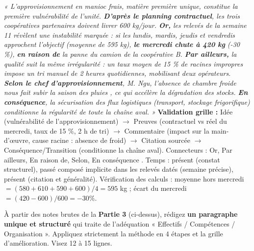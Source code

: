 \documentclass[11pt]{article}
\begin{document}
\begin{exoresolu}
\emph{« L'approvisionnement en manioc frais, matière première unique, constitue la première vulnérabilité de l'unité. \textbf{D'après le planning contractuel}, les trois coopératives partenaires doivent livrer 600 kg/jour. \textbf{Or,} les relevés de la semaine 11 révèlent une instabilité marquée : si les lundis, mardis, jeudis et vendredis approchent l'objectif (moyenne de 595 kg), \textbf{le mercredi chute à 420 kg} (-30 \%), \textbf{en raison de} la panne du camion de la coopérative B. \textbf{Par ailleurs,} la qualité suit la même irrégularité : un taux moyen de 15 \% de racines impropres impose un tri manuel de 2 heures quotidiennes, mobilisant deux opérateurs. \textbf{Selon le chef d'approvisionnement}, M. Ngu, \og l'absence de chambre froide nous fait subir la saison des pluies \fg{}, ce qui accélère la dégradation des stocks. \textbf{En conséquence}, la sécurisation des flux logistiques (transport, stockage frigorifique) conditionne la régularité de toute la chaîne aval. »}
\tcblower
\textcolor{popgreen}{\textbf{Validation grille :}} Idée (vulnérabilité de l'approvisionnement) $\rightarrow$ Preuves (contractuel vs réel du mercredi, taux de 15 \%, 2 h de tri) $\rightarrow$ Commentaire (impact sur la main-d'œuvre, cause racine : absence de froid) $\rightarrow$ Citation sourcée $\rightarrow$ Conséquence/Transition (conditionne la chaîne aval). Connecteurs : \og Or, Par ailleurs, En raison de, Selon, En conséquence \fg{}. Temps : présent (constat structurel), passé composé implicite dans les relevés datés (semaine précise), présent (citation et généralité). Vérification des calculs : moyenne hors mercredi $= (580 + 610 + 590 + 600)/4 = 595$ kg ; écart du mercredi $= (420 - 600)/600 = -30 \%$.
\end{exoresolu}

\begin{exercice}
À partir des notes brutes de la \textbf{Partie 3} (ci-dessus), rédigez \textbf{un paragraphe unique et structuré} qui traite de l'adéquation « Effectifs / Compétences / Organisation ». Appliquez strictement la méthode en 4 étapes et la grille d'amélioration. Visez 12 à 15 lignes.
\end{exercice}
\end{document}
